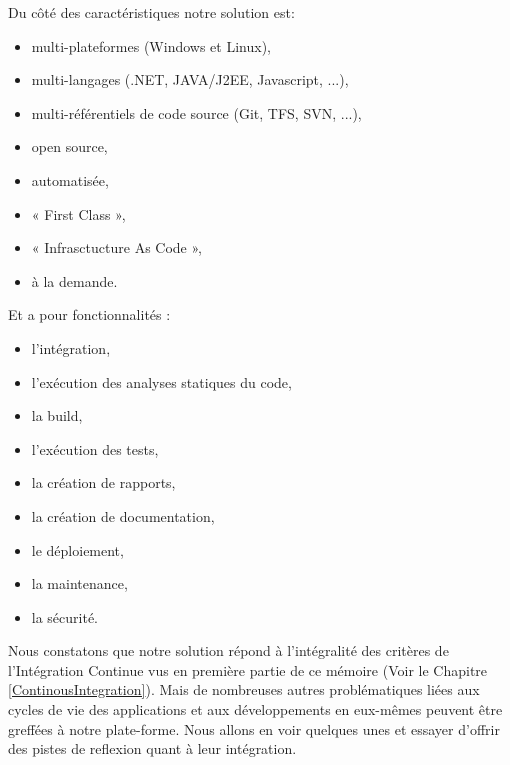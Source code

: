       Du côté des caractéristiques notre solution est:\\

      \begin{itemize}
        \item multi-plateformes (Windows et Linux),
        \item multi-langages (.NET, JAVA/J2EE, Javascript, ...),
        \item multi-référentiels de code source (Git, TFS, SVN, ...),
        \item open source,
        \item automatisée,
        \item « First Class »,
        \item « Infrasctucture As Code »,
        \item à la demande.
      \end{itemize}

      Et a pour fonctionnalités :\\

      \begin{itemize}
        \item l'intégration,
        \item l'exécution des analyses statiques du code,
        \item la build,
        \item l'exécution des tests,
        \item la création de rapports,
        \item la création de documentation,
        \item le déploiement,
        \item la maintenance,
        \item la sécurité.\\
      \end{itemize}

      Nous constatons que notre solution répond à l'intégralité des critères de l'Intégration Continue vus en première partie de ce mémoire (Voir le Chapitre \ref{ContinousIntegration}). Mais de nombreuses autres problématiques liées aux cycles de vie des applications et aux développements en eux-mêmes peuvent être greffées à notre plate-forme. Nous allons en voir quelques unes et essayer d'offrir des pistes de reflexion quant à leur intégration.


